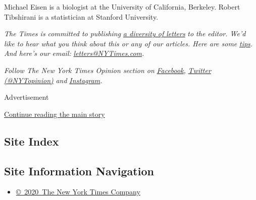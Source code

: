 Michael Eisen is a biologist at the University of California, Berkeley.
Robert Tibshirani is a statistician at Stanford University.

\emph{The Times is committed to publishing}
\href{https://www.nytimes3xbfgragh.onion/2019/01/31/opinion/letters/letters-to-editor-new-york-times-women.html}{\emph{a
diversity of letters}} \emph{to the editor. We'd like to hear what you
think about this or any of our articles. Here are some}
\href{https://help.nytimes3xbfgragh.onion/hc/en-us/articles/115014925288-How-to-submit-a-letter-to-the-editor}{\emph{tips}}\emph{.
And here's our email:}
\href{mailto:letters@NYTimes.com}{\emph{letters@NYTimes.com}}\emph{.}

\emph{Follow The New York Times Opinion section on}
\href{https://www.facebookcorewwwi.onion/nytopinion}{\emph{Facebook}}\emph{,}
\href{http://twitter.com/NYTOpinion}{\emph{Twitter (@NYTopinion)}}
\emph{and}
\href{https://www.instagram.com/nytopinion/}{\emph{Instagram}}\emph{.}

Advertisement

\protect\hyperlink{after-bottom}{Continue reading the main story}

\hypertarget{site-index}{%
\subsection{Site Index}\label{site-index}}

\hypertarget{site-information-navigation}{%
\subsection{Site Information
Navigation}\label{site-information-navigation}}

\begin{itemize}
\tightlist
\item
  \href{https://help.nytimes3xbfgragh.onion/hc/en-us/articles/115014792127-Copyright-notice}{©~2020~The
  New York Times Company}
\end{itemize}

